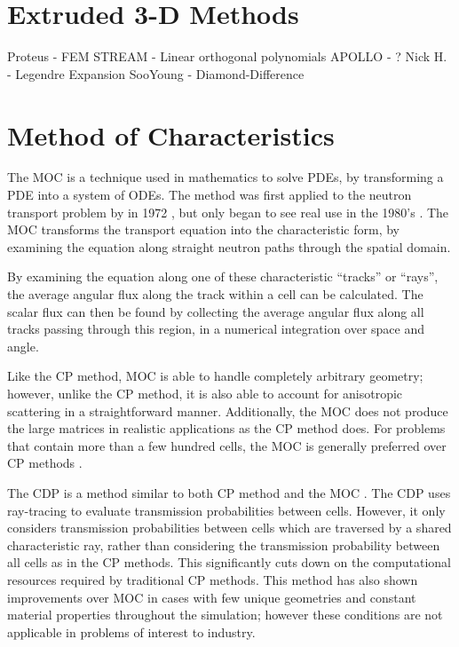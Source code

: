 {{    %
  }

  \section{Extruded 3-D Methods}{\label{sec:3T:Extruded 3-D Methods}
    Proteus - FEM
    STREAM - Linear orthogonal polynomials
    APOLLO - ?
    Nick H. - Legendre Expansion
    SooYoung - Diamond-Difference
  }

  \section{Method of Characteristics}{\label{sec:3T:Method of Characteristics}
    The \acf{MOC} is a technique used in mathematics to solve \acp{PDE}, by transforming a \ac{PDE} into a system of \acp{ODE}.
    The method was first applied to the neutron transport problem by \citeauthor{Askew1972} in 1972 \cite{Askew1972}, but only began to see real use in the 1980's \cite{Halsall1980}.
    The \ac{MOC} transforms the transport equation into the characteristic form, by examining the equation along straight neutron paths through the spatial domain.

    By examining the equation along one of these characteristic ``tracks'' or ``rays'', the average angular flux along the track within a cell can be calculated.
    The scalar flux can then be found by collecting the average angular flux along all tracks passing through this region, in a numerical integration over space and angle.

    Like the \ac{CP} method, \ac{MOC} is able to handle completely arbitrary geometry; however, unlike the \ac{CP} method, it is also able to account for anisotropic scattering in a straightforward manner.
    Additionally, the \ac{MOC} does not produce the large matrices in realistic applications as the \ac{CP} method does.
    For problems that contain more than a few hundred cells, the \ac{MOC} is generally preferred over \ac{CP} methods \cite{Hebert2010}.

    The \ac{CDP} is a method similar to both \ac{CP} method and the \ac{MOC} \cite{Hong1999,Liu2014}.
    The \ac{CDP} uses ray-tracing to evaluate transmission probabilities between cells.
    However, it only considers transmission probabilities between cells which are traversed by a shared characteristic ray, rather than considering the transmission probability between all cells as in the \ac{CP} methods.
    This significantly cuts down on the computational resources required by traditional \ac{CP} methods.
    This method has also shown improvements over \ac{MOC} in cases with few unique geometries and constant material properties throughout the simulation; however these conditions are not applicable in problems of interest to industry.

}}
